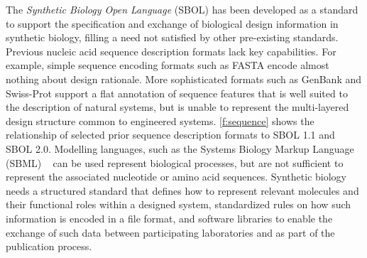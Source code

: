 The \emph{Synthetic Biology Open Language} (SBOL) has been developed as a standard to support the specification and exchange of biological design information in synthetic biology, filling a need not satisfied by other pre-existing standards.
Previous nucleic acid sequence description formats lack key capabilities. For example,  simple sequence encoding formats such as FASTA encode almost nothing about design rationale. More sophisticated formats such as GenBank and Swiss-Prot support a flat annotation of sequence features that is well suited to the  description of natural systems, but is unable to represent the multi-layered design structure common to engineered systems.
\ref{f:sequence} shows the relationship of selected prior sequence description formats to SBOL 1.1 and SBOL 2.0.
Modelling languages, such as the Systems Biology Markup Language (SBML) ~\cite{SBML} can be used represent biological processes, but are not sufficient to represent the associated nucleotide or amino acid sequences.  %
Synthetic biology needs a structured standard that defines how to represent relevant molecules and their functional roles within a designed system, standardized rules on how such information is encoded in a file format, and software libraries to enable the exchange of such data between participating laboratories and as part of the publication process. 

